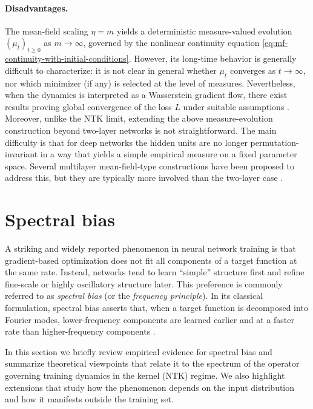 \paragraph{Disadvantages.}
The mean-field scaling $\eta=m$ yields a deterministic measure-valued evolution
$(\mu_t)_{t\ge 0}$ as $m\to\infty$, governed by the nonlinear continuity
equation \eqref{eq:mf-continuity-with-initial-conditions}. However, its
long-time behavior is generally difficult to characterize: it is not clear in
general whether $\mu_t$ converges as $t\to\infty$, nor which minimizer (if any)
is selected at the level of measures. Nevertheless, when the dynamics is
interpreted as a Wasserstein gradient flow, there exist results proving global
convergence of the loss $L$ under suitable assumptions
\citep{Mei2018meanfieldview,chizat2018globalconvergencegradientdescent}.
Moreover, unlike the NTK limit, extending the above measure-evolution
construction beyond two-layer networks is not straightforward. The main
difficulty is that for deep networks the hidden units are no longer
permutation-invariant in a way that yields a simple empirical measure on a
fixed parameter space. Several multilayer mean-field-type constructions have
been proposed to address this, but they are typically more involved than the
two-layer case \citep{nguyen2019meanfieldlimitlearning,araujo2019meanfieldlimitcertaindeep,
	sirignano2019meanfieldanalysisneural,nguyen2023rigorousframeworkmeanfield}.


\section{Spectral bias}\label{sec:spectral-bias}

A striking and widely reported phenomenon in neural network training is that
gradient-based optimization does not fit all components of a target function at
the same rate. Instead, networks tend to learn ``simple'' structure first and
refine fine-scale or highly oscillatory structure later. This preference is
commonly referred to as \emph{spectral bias} (or the \emph{frequency principle}).
In its classical formulation, spectral bias asserts that, when a target function
is decomposed into Fourier modes, lower-frequency components are learned
earlier and at a faster rate than higher-frequency components
\citep{rahaman2019spectralbiasneuralnetworks}.

In this section we briefly review empirical evidence for spectral bias and
summarize theoretical viewpoints that relate it to the spectrum of the operator
governing training dynamics in the kernel (NTK) regime. We also highlight
extensions that study how the phenomenon depends on the input distribution and
how it manifests outside the training set.

